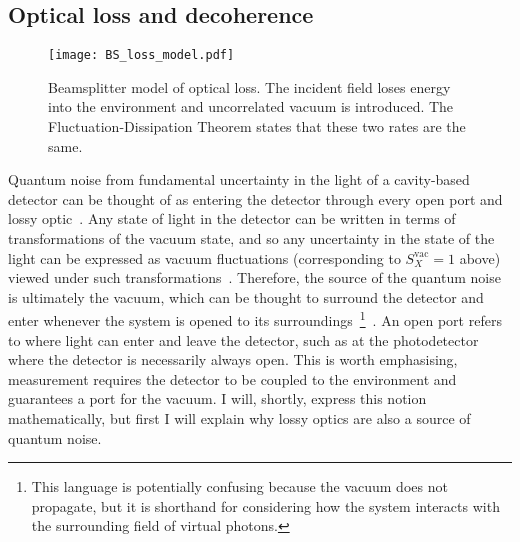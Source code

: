 \subsection{Optical loss and decoherence}
\label{sec:optical_loss_background}

\begin{figure}
	\centering
	\texttt{[image: BS\_loss\_model.pdf]}
	\caption{ Beamsplitter model of optical loss. The incident field loses energy into the environment and uncorrelated vacuum is introduced. The Fluctuation-Dissipation Theorem states that these two rates are the same.}
	\label{fig:beamsplitter_loss}
\end{figure}


Quantum noise from fundamental uncertainty in the light of a cavity-based detector can be thought of as entering the detector through every open port and lossy optic~\cite{}. %
Any state of light in the detector can be written in terms of transformations of the vacuum state, and so any uncertainty in the state of the light can be expressed as vacuum fluctuations (corresponding to $S_X^\text{vac}=1$ above) viewed under such transformations~\cite{}. Therefore, the source of the quantum noise is ultimately the vacuum, which can be thought to surround the detector and enter whenever the system is opened to its surroundings~\footnote{This language is potentially confusing because the vacuum does not propagate, but it is shorthand for considering how the system interacts with the surrounding field of virtual photons.}~\cite{}. An open port refers to where light can enter and leave the detector, such as at the photodetector where the detector is necessarily always open. This is worth emphasising, measurement requires the detector to be coupled to the environment and guarantees a port for the vacuum. %
I will, shortly, express this notion mathematically, but first I will explain why lossy optics are also a source of quantum noise.

